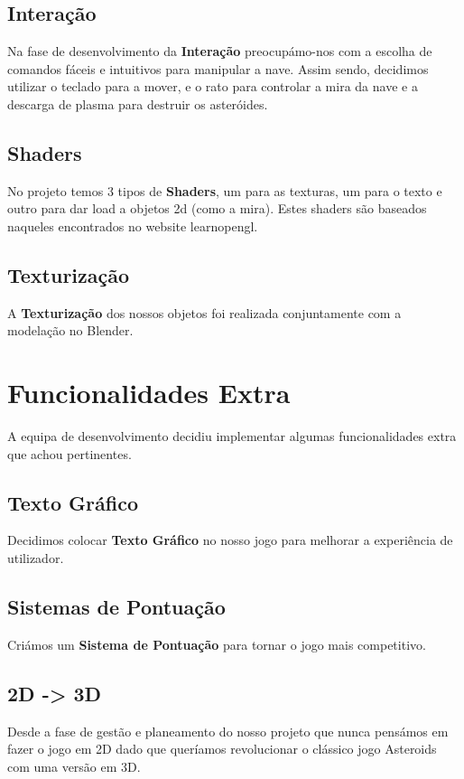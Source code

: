 \subsection{Interação}
Na fase de desenvolvimento da \textbf{Interação} preocupámo-nos com a escolha de comandos fáceis e intuitivos para manipular a nave. Assim sendo, decidimos utilizar o teclado para a mover, e o rato para controlar a mira da nave e a descarga de plasma para destruir os asteróides.
\subsection{Shaders}
No projeto temos 3 tipos de \textbf{Shaders}, um para as texturas, um para o texto e outro para dar load a objetos 2d (como a mira). Estes shaders são baseados naqueles encontrados no website learnopengl.
\subsection{Texturização}
A \textbf{Texturização} dos nossos objetos foi realizada conjuntamente com a modelação no Blender.

\section{Funcionalidades Extra}
\label{chap4:sec:func-extra}
A equipa de desenvolvimento decidiu implementar algumas funcionalidades extra que achou pertinentes.

\subsection{Texto Gráfico}
Decidimos colocar \textbf{Texto Gráfico} no nosso jogo para melhorar a experiência de utilizador.

\subsection{Sistemas de Pontuação}
Criámos um \textbf{Sistema de Pontuação} para tornar o jogo mais competitivo.

\subsection{2D -> 3D}
Desde a fase de gestão e planeamento do nosso projeto que nunca pensámos em fazer o jogo em 2D dado que queríamos revolucionar o clássico jogo Asteroids com uma versão em 3D.

